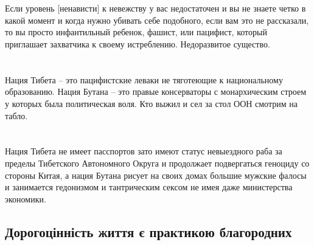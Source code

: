 \\
\\
Если уровень [ненависти] к невежству у вас недостаточен и вы не знаете четко в какой момент и когда нужно убивать себе подобного, если вам это не рассказали, то вы просто инфантильный ребенок, фашист, или пацифист, который приглашает захватчика к своему истреблению. Недоразвитое существо.\\
\\
\\
Нация Тибета -- это пацифистские леваки не тяготеющие к национальному образованию. Нация Бутана -- это правые консерваторы с монархическим строем у которых была политическая воля. Кто выжил и сел за стол ООН смотрим на табло.\\
\\
\\
Нация Тибета не имеет пасспортов зато имеют статус невыездного раба за пределы Тибетского Автономного Округа и продолжает подвергаться геноциду со стороны Китая, а нация Бутана рисует на своих домах большие мужские фалосы и занимается гедонизмом и тантрическим сексом не имея даже министерства экономики.\\

\subsection{Дорогоцінність життя є практикою благородних}

